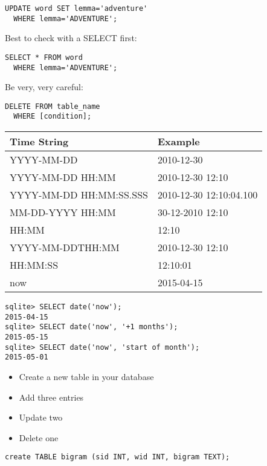 \documentclass[a4paper,landscape,headrule,footrule,dvips]{foils}
\begin{document}
\begin{CJK}{UTF8}{min}
\begin{verbatim}
UPDATE word SET lemma='adventure'
  WHERE lemma='ADVENTURE';
\end{verbatim}


Best to check with a SELECT first:
\begin{verbatim}
SELECT * FROM word 
  WHERE lemma='ADVENTURE';
\end{verbatim}


Be very, very careful:
\begin{verbatim}
DELETE FROM table_name
  WHERE [condition];
\end{verbatim}

\begin{tabular}{ll}
Time String  & Example \\ \hline
YYYY-MM-DD & 2010-12-30 \\
YYYY-MM-DD HH:MM & 2010-12-30 12:10 \\
YYYY-MM-DD HH:MM:SS.SSS & 2010-12-30 12:10:04.100 \\
MM-DD-YYYY HH:MM & 30-12-2010 12:10 \\
HH:MM & 12:10 \\
YYYY-MM-DDTHH:MM & 2010-12-30 12:10 \\
HH:MM:SS & 12:10:01 \\
now & 2015-04-15
\end{tabular}
\begin{verbatim}
sqlite> SELECT date('now');
2015-04-15
sqlite> SELECT date('now', '+1 months');
2015-05-15
sqlite> SELECT date('now', 'start of month');
2015-05-01
\end{verbatim}


\begin{itemize}
\item Create a new table in your database
\item Add three entries
\item Update two
\item Delete one
\end{itemize}


\begin{verbatim}
create TABLE bigram (sid INT, wid INT, bigram TEXT);


\end{verbatim}
\end{CJK}
\end{document}
